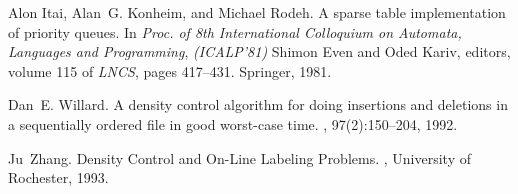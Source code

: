 \documentclass[11pt]{article}
\begin{document}
\begin{thebibliography}{32}
Alon Itai, Alan~G. Konheim, and Michael Rodeh.
\newblock A sparse table implementation of priority queues.
\newblock In \emph{Proc. of 8th International Colloquium on Automata, Languages and Programming}, {\em (ICALP'81)} Shimon Even and Oded Kariv, editors, volume 115 of {\em LNCS}, pages 417--431. Springer, 1981.

Dan~E. Willard.
\newblock A density control algorithm for doing insertions and deletions in a sequentially ordered file in good worst-case time.
, 97(2):150--204, 1992.

Ju~Zhang.
\newblock Density Control and On-Line Labeling Problems.
, University of Rochester, 1993.
\end{thebibliography}
\end{document}
